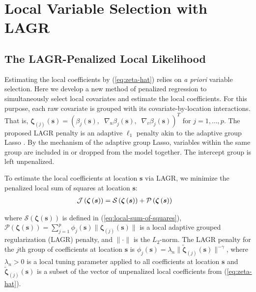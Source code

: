 \documentclass[authoryear,review, 12pt]{elsarticle}
\begin{document}
\section{Local Variable Selection with LAGR\label{sec:lagr-gaussian}}


\subsection{The LAGR-Penalized Local Likelihood}

Estimating the local coefficients by (\ref{eq:zeta-hat}) relies on
\emph{a priori} variable selection. Here we develop a new method of
penalized regression to simultaneously select local covariates and
estimate the local coefficients. For this purpose, each raw covariate
is grouped with its covariate-by-location interactions. That is, $\bm{\zeta}_{\left(j\right)}(\bm{s})=\left(\beta_{j}(\bm{s}),\;\;\nabla_{u}\beta_{j}(\bm{s}),\;\;\nabla_{v}\beta_{j}(\bm{s})\right)^{T}$
for $j=1,\dots,p$. The proposed LAGR penalty is an adaptive $\ell_{1}$
penalty akin to the adaptive group Lasso \citep{Wang-Leng-2008,Zou-2006}.
By the mechanism of the adaptive group Lasso, variables within the
same group are included in or dropped from the model together. The
intercept group is left unpenalized.

To estimate the local coefficients at location $\bm{s}$ via LAGR,
we minimize the penalized local sum of squares at location $\bm{s}$:
\begin{align}
\mathcal{J}\left(\bm{\zeta}\left(\bm{s}\right)\right) & =\mathcal{S}\left(\bm{\zeta}\left(\bm{s}\right)\right)+\mathcal{P}\left(\bm{\zeta}\left(\bm{s}\right)\right)\notag\label{eq:adaptive-lasso-WLS}
\end{align}


where $\mathcal{S}\left(\bm{\zeta}\left(\bm{s}\right)\right)$ is
defined in (\ref{eq:local-sum-of-squares}), $\mathcal{P}\left(\bm{\zeta}\left(\bm{s}\right)\right)=\sum_{j=1}^{p}\phi_{j}(\bm{s})\|\bm{\zeta}_{\left(j\right)}(\bm{s})\|$
is a local adaptive grouped regularization (LAGR) penalty, and $\|\cdot\|$
is the $L_{2}$-norm. The LAGR penalty for the $j$th group of coefficients
at location $\bm{s}$ is $\phi_{j}(\bm{s})=\lambda_{n}\|\tilde{\bm{\zeta}}_{\left(j\right)}(\bm{s})\|^{-\gamma}$,
where $\lambda_{n}>0$ is a local tuning parameter applied to all
coefficients at location $\bm{s}$ and $\tilde{\bm{\zeta}}_{\left(j\right)}(\bm{s})$
is a subset of the vector of unpenalized local coefficients from (\ref{eq:zeta-hat}).
\end{document}
